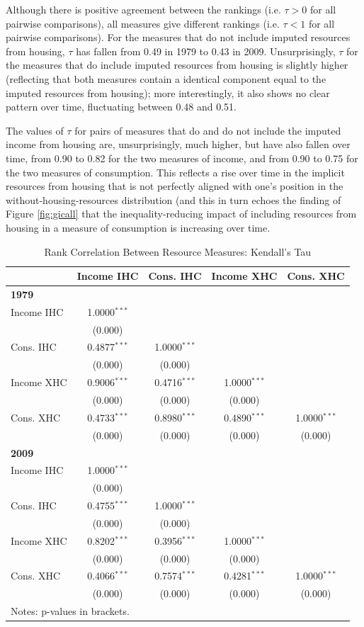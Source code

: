 Although there is positive agreement between the rankings (i.e. $\tau>0$ for all pairwise comparisons), all measures give different rankings (i.e. $\tau<1$ for all pairwise comparisons). For the measures that do not include imputed resources from housing, $\tau$ has fallen from 0.49 in 1979 to 0.43 in 2009. Unsurprisingly, $\tau$ for the measures that do include imputed resources from housing is slightly higher (reflecting that both measures contain a identical component equal to the imputed resources from housing); more interestingly, it also shows no clear pattern over time, fluctuating between 0.48 and 0.51.

The values of $\tau$ for pairs of measures that do and do not include the imputed income from housing are, unsurprisingly, much higher, but have also fallen over time, from 0.90 to 0.82 for the two measures of income, and from 0.90 to 0.75 for the two measures of consumption. This reflects a rise over time in the implicit resources from housing that is not perfectly aligned with one's position in the without-housing-resources distribution (and this in turn echoes the finding of Figure \ref{fig:gicall} that the inequality-reducing impact of including resources from housing in a measure of consumption is increasing over time.

\begin{table}[tp!]
\caption{Rank Correlation Between Resource Measures: Kendall's Tau}
\centering
\begin{tabular}{lcccc}
\hline\hline 	
 &  Income IHC & Cons. IHC & Income XHC & Cons. XHC \\
\hline
\multicolumn{5}{l}{\textbf{1979}}  \\
Income IHC &1.0000$^{***}$ & & & \\
 & (0.000)  & & & \\
Cons. IHC & 0.4877$^{***}$&1.0000$^{***}$ & & \\
 & (0.000) &(0.000) & & \\
Income XHC & 0.9006$^{***}$&0.4716$^{***}$ &1.0000$^{***}$ & \\
  & (0.000) &(0.000) & (0.000) & \\
Cons. XHC &0.4733$^{***}$ &0.8980$^{***}$ &0.4890$^{***}$ &1.0000$^{***}$ \\
 & (0.000) &(0.000) & (0.000) & (0.000) \\
\hline
\multicolumn{5}{l}{\textbf{2009}}  \\
Income IHC &1.0000$^{***}$ & & & \\
 & (0.000)  & & & \\
Cons. IHC & 0.4755$^{***}$&1.0000$^{***}$ & & \\
 & (0.000) &(0.000) & & \\
Income XHC & 0.8202$^{***}$&0.3956$^{***}$ &1.0000$^{***}$ & \\
  & (0.000) &(0.000) & (0.000) & \\
Cons. XHC &0.4066$^{***}$ &0.7574$^{***}$ &0.4281$^{***}$ &1.0000$^{***}$ \\
 & (0.000) &(0.000) & (0.000) & (0.000) \\
\hline\hline
\multicolumn{5}{l}{Notes: p-values in brackets. }
\end{tabular}
\label{table:kendall}
\end{table}



